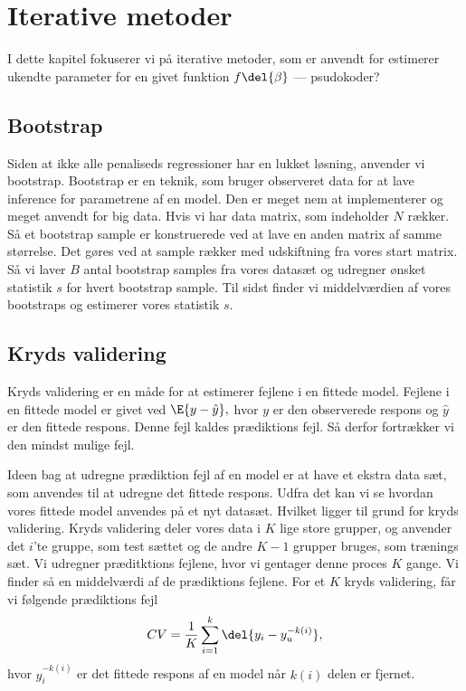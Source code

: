 \chapter{Iterative metoder}
I dette kapitel fokuserer vi på iterative metoder, som er anvendt for estimerer ukendte parameter for en givet funktion $f \del{\beta}$
--- psudokoder? 

\section{Bootstrap}
Siden at ikke alle penaliseds regressioner har en lukket løsning, anvender vi bootstrap. 
Bootstrap er en teknik, som bruger observeret data for at lave inference for parametrene af en model. Den er meget nem at implementerer og meget anvendt for big data. 
Hvis vi har data matrix, som indeholder $N$ rækker. Så et bootstrap sample er konstruerede ved at lave en anden matrix af samme størrelse. Det gøres ved at sample rækker med udskiftning fra vores start matrix. 
Så vi laver $B$ antal bootstrap samples fra vores datasæt og udregner ønsket statistik $s$ for hvert bootstrap sample. Til sidst finder vi middelværdien af vores bootstraps og estimerer vores statistik $s$.

\section{Kryds validering}
Kryds validering er en måde for at estimerer fejlene i en fittede model. Fejlene i en fittede model er givet ved $\E{y - \hat{y}},$ hvor $y$ er den observerede respons og  $\hat{y} $ er den fittede respons. Denne fejl kaldes prædiktions fejl. Så derfor fortrækker vi den mindst mulige fejl. 

Ideen bag at udregne prædiktion fejl af en model er at have et ekstra data sæt, som anvendes til at udregne det fittede respons. 
Udfra det kan vi se hvordan vores fittede model anvendes på et nyt datasæt. 
Hvilket ligger til grund for kryds validering. Kryds validering deler vores data i $K$ lige store  grupper, og anvender det $i$'te gruppe, som test sættet og de andre $K-1$ grupper bruges, som trænings sæt. Vi udregner præditktions fejlene, hvor vi gentager denne proces $K$ gange. Vi finder så en middelværdi af de prædiktions fejlene. 
For et $K$ kryds validering, får vi følgende prædiktions fejl
\begin{align*}
CV = \frac{1}{K} \sum_{i =1}^k \del{y_i - y_u^{-k(i)}},
\end{align*}
hvor $y_i^{-k(i)}$ er det fittede respons af en model når $k(i)$ delen er fjernet. 